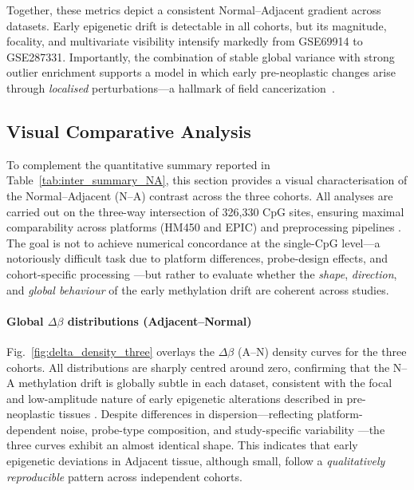 \documentclass[10pt]{extarticle}
\begin{document}
Together, these metrics depict a consistent Normal--Adjacent gradient across datasets.  
Early epigenetic drift is detectable in all cohorts, but its magnitude, focality, and 
multivariate visibility intensify markedly from GSE69914 to GSE287331.  
Importantly, the combination of stable global variance with strong outlier enrichment 
supports a model in which early pre-neoplastic changes arise through \emph{localised} 
perturbations—a hallmark of field cancerization~\cite{Yates2024_NormalMucosaField, teschendorff2016}.

\subsection{Visual Comparative Analysis}
\label{subsec:inter_visual}

To complement the quantitative summary reported in 
Table~\ref{tab:inter_summary_NA}, this section provides a visual 
characterisation of the Normal--Adjacent (N--A) contrast across the three 
cohorts.  
All analyses are carried out on the three-way intersection of 
326{,}330 CpG sites, ensuring maximal comparability across platforms 
(HM450 and EPIC) and preprocessing pipelines \cite{zhou2017}.  
The goal is not to achieve numerical concordance at the single-CpG 
level---a notoriously difficult task due to platform differences, 
probe-design effects, and cohort-specific processing 
\cite{pidsley2016, Fortin2014_funnorm}---but rather to evaluate 
whether the \emph{shape}, \emph{direction}, and \emph{global behaviour} 
of the early methylation drift are coherent across studies.


\paragraph{Global $\Delta\beta$ distributions (Adjacent--Normal)}

Fig.~\ref{fig:delta_density_three} overlays the $\Delta\beta$ 
(A--N) density curves for the three cohorts.  
All distributions are sharply centred around zero, confirming that 
the N--A methylation drift is globally subtle in each dataset, 
consistent with the focal and low-amplitude nature of early 
epigenetic alterations described in pre-neoplastic tissues 
\cite{teschendorff2016, Timp2013_EpigeneticModel}.  
Despite differences in dispersion---reflecting platform-dependent noise, 
probe-type composition, and study-specific variability 
\cite{maksimovic2012, pidsley2016}---the three curves 
exhibit an almost identical shape.  
This indicates that early epigenetic deviations in Adjacent tissue, 
although small, follow a \emph{qualitatively reproducible} pattern across 
independent cohorts.
\end{document}
